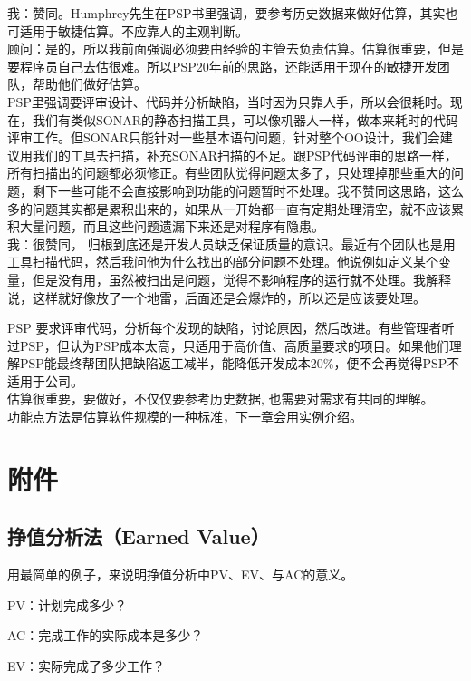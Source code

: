 {\begin{minipage}[t]{0.97\columnwidth}
我：赞同。Humphrey先生在PSP书里强调，要参考历史数据来做好估算，其实也可适用于敏捷估算。不应靠人的主观判断。\\
顾问：是的，所以我前面强调必须要由经验的主管去负责估算。估算很重要，但是要程序员自己去估很难。所以PSP20年前的思路，还能适用于现在的敏捷开发团队，帮助他们做好估算。\\
PSP里强调要评审设计、代码并分析缺陷，当时因为只靠人手，所以会很耗时。现在，我们有类似SONAR的静态扫描工具，可以像机器人一样，做本来耗时的代码评审工作。但SONAR只能针对一些基本语句问题，针对整个OO设计，我们会建议用我们的工具去扫描，补充SONAR扫描的不足。跟PSP代码评审的思路一样，所有扫描出的问题都必须修正。有些团队觉得问题太多了，只处理掉那些重大的问题，剩下一些可能不会直接影响到功能的问题暂时不处理。我不赞同这思路，这么多的问题其实都是累积出来的，如果从一开始都一直有定期处理清空，就不应该累积大量问题，而且这些问题遗漏下来还是对程序有隐患。\\
我：很赞同，
归根到底还是开发人员缺乏保证质量的意识。最近有个团队也是用工具扫描代码，然后我问他为什么找出的部分问题不处理。他说例如定义某个变量，但是没有用，虽然被扫出是问题，觉得不影响程序的运行就不处理。我解释说，这样就好像放了一个地雷，后面还是会爆炸的，所以还是应该要处理。
\strut
\end{minipage}}

PSP 要求评审代码，分析每个发现的缺陷，讨论原因，然后改进。有些管理者听过PSP，但认为PSP成本太高，只适用于高价值、高质量要求的项目。如果他们理解PSP能最终帮团队把缺陷返工减半，能降低开发成本20\%，便不会再觉得PSP不适用于公司。\\

估算很重要，要做好，不仅仅要参考历史数据, 也需要对需求有共同的理解。\\
功能点方法是估算软件规模的一种标准，下一章会用实例介绍。

\hypertarget{ux9644ux4ef6}{%
\section{附件}\label{ux9644ux4ef6}}

\hypertarget{ux6323ux503cux5206ux6790ux6cd5earned-value}{%
\subsection{挣值分析法（Earned
Value）}\label{ux6323ux503cux5206ux6790ux6cd5earned-value}}

用最简单的例子，来说明挣值分析中PV、EV、与AC的意义。

\begin{description}
\tightlist
\item[]
PV：计划完成多少？
\item[]
AC：完成工作的实际成本是多少？
\item[]
EV：实际完成了多少工作？
\end{description}

